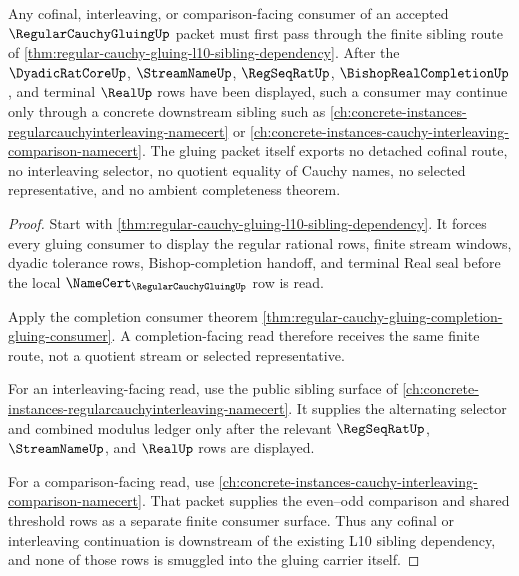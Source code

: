 \begin{theorem}
\label{thm:regular-cauchy-gluing-sibling-route}
Any cofinal, interleaving, or comparison-facing consumer of an accepted $\RegularCauchyGluingUp$ packet must first pass through the finite sibling route of \autoref{thm:regular-cauchy-gluing-l10-sibling-dependency}. After the $\DyadicRatCoreUp$, $\StreamNameUp$, $\RegSeqRatUp$, $\BishopRealCompletionUp$, and terminal $\RealUp$ rows have been displayed, such a consumer may continue only through a concrete downstream sibling such as \autoref{ch:concrete-instances-regularcauchyinterleaving-namecert} or \autoref{ch:concrete-instances-cauchy-interleaving-comparison-namecert}. The gluing packet itself exports no detached cofinal route, no interleaving selector, no quotient equality of Cauchy names, no selected representative, and no ambient completeness theorem.
\end{theorem}
\begin{proof}
Start with \autoref{thm:regular-cauchy-gluing-l10-sibling-dependency}. It forces every gluing consumer to display the regular rational rows, finite stream windows, dyadic tolerance rows, Bishop-completion handoff, and terminal Real seal before the local $\NameCert_{\RegularCauchyGluingUp}$ row is read.

Apply the completion consumer theorem \autoref{thm:regular-cauchy-gluing-completion-gluing-consumer}. A completion-facing read therefore receives the same finite route, not a quotient stream or selected representative.

For an interleaving-facing read, use the public sibling surface of \autoref{ch:concrete-instances-regularcauchyinterleaving-namecert}. It supplies the alternating selector and combined modulus ledger only after the relevant $\RegSeqRatUp$, $\StreamNameUp$, and $\RealUp$ rows are displayed.

For a comparison-facing read, use \autoref{ch:concrete-instances-cauchy-interleaving-comparison-namecert}. That packet supplies the even--odd comparison and shared threshold rows as a separate finite consumer surface. Thus any cofinal or interleaving continuation is downstream of the existing L10 sibling dependency, and none of those rows is smuggled into the gluing carrier itself.
\end{proof}

